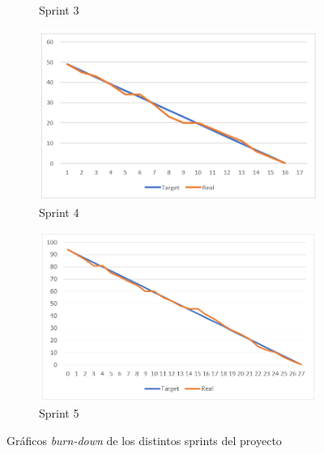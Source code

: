 \begin{figure}[hbtp]
\begin{subfigure}{.5\textwidth}
    \caption{Sprint 3}
    \label{fig:sprint3}
\end{subfigure}
\begin{subfigure}{.5\textwidth}
    \includegraphics[width=\linewidth]{figuras/sprint4.png}
    \caption{Sprint 4}
    \label{fig:sprint4}
\end{subfigure}
\begin{subfigure}{\textwidth}
    \centering
    \includegraphics[width=.5\linewidth]{figuras/sprint5.png}
    \caption{Sprint 5}
    \label{fig:sprint5}
\end{subfigure}
\caption{Gráficos \textit{burn-down} de los distintos sprints del proyecto}
\label{fig:sprints}
\end{figure}

